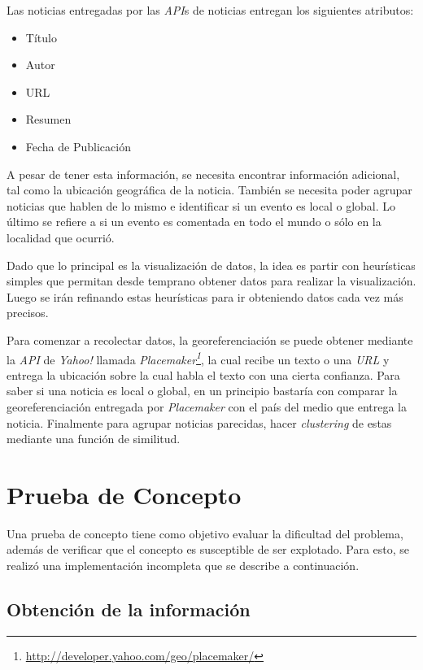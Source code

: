 \documentclass[10pt]{article}
\begin{document}
Las noticias entregadas por las \emph{API}s de noticias entregan los siguientes atributos: 

\begin{itemize}
	\item Título
	\item Autor
	\item URL
	\item Resumen
	\item Fecha de Publicación
\end{itemize}

A pesar de tener esta información, se necesita encontrar información adicional, tal como la ubicación geográfica de la noticia. También se necesita poder agrupar noticias que hablen de lo mismo e identificar si un evento es local o global. Lo último se refiere a si un evento es comentada en todo el mundo o sólo en la localidad que ocurrió.

Dado que lo principal es la visualización de datos, la idea es partir con heurísticas simples que permitan desde temprano obtener datos para realizar la visualización. Luego se irán refinando estas heurísticas para ir obteniendo datos cada vez más precisos.

Para comenzar a recolectar datos, la georeferenciación se puede obtener mediante la \emph{API} de \emph{Yahoo!} llamada \emph{Placemaker\footnote{\url{http://developer.yahoo.com/geo/placemaker/}}}, la cual recibe un texto o una \emph{URL} y entrega la ubicación sobre la cual habla el texto con una cierta confianza. Para saber si una noticia es local o global, en un principio bastaría con comparar la georeferenciación entregada por \emph{Placemaker} con el país del medio que entrega la noticia. Finalmente para agrupar noticias parecidas, hacer \emph{clustering} de estas mediante una función de similitud.

\section{Prueba de Concepto}

Una prueba de concepto tiene como objetivo evaluar la dificultad del problema, además de verificar que el concepto es susceptible de ser explotado. Para esto, se realizó una implementación incompleta que se describe a continuación.

\subsection{Obtención de la información}
\end{document}
